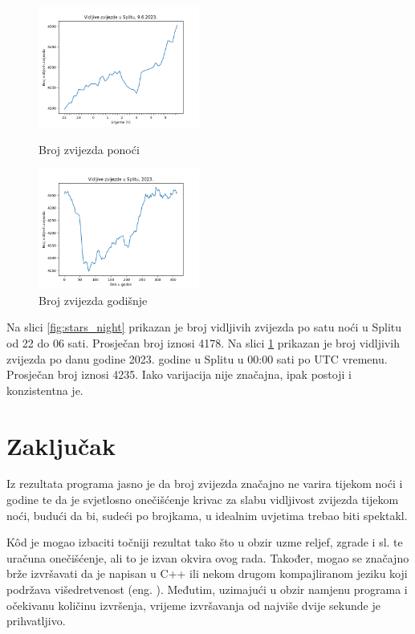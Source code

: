 \begin{figure}[h]
  \begin{minipage}[t]{0.48\linewidth}
    \centering
    \includegraphics[height=150px]{assets/plt-stars_night.png}
    \caption{Broj zvijezda ponoći}\label{fig:stars_night}
  \end{minipage}
  \begin{minipage}[t]{0.48\linewidth}
    \centering
    \includegraphics[height=150px]{assets/plt-stars_year.png}
    \caption{Broj zvijezda godišnje}\label{fig:stars_year}
  \end{minipage}
\end{figure}

Na slici \ref{fig:stars_night} prikazan je broj vidljivih zvijezda po satu noći u Splitu od 22 do 06 sati. Prosječan broj iznosi 4178. Na slici \ref{fig:stars_year} prikazan je broj vidljivih zvijezda po danu godine 2023. godine u Splitu u 00:00 sati po UTC vremenu. Prosječan broj iznosi 4235. Iako varijacija nije značajna, ipak postoji i konzistentna je.

\section{Zaključak}
Iz rezultata programa jasno je da broj zvijezda značajno ne varira tijekom noći i godine te da je svjetlosno onečišćenje krivac za slabu vidljivost zvijezda tijekom noći, budući da bi, sudeći po brojkama, u idealnim uvjetima trebao biti spektakl.

Kôd je mogao izbaciti točniji rezultat tako što u obzir uzme reljef, zgrade i sl. te uračuna onečišćenje, ali to je izvan okvira ovog rada. Također, mogao se značajno brže izvršavati da je napisan u C++ ili nekom drugom kompajliranom jeziku koji podržava višedretvenost (eng. ). Međutim, uzimajući u obzir namjenu programa i očekivanu količinu izvršenja, vrijeme izvršavanja od najviše dvije sekunde je prihvatljivo.



